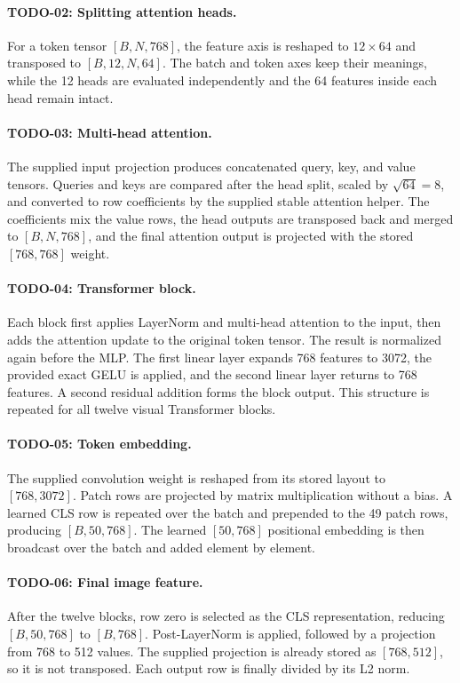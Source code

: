 \documentclass[a4paper,12pt]{article}
\begin{document}
\paragraph{TODO-02: Splitting attention heads.}
For a token tensor \([B,N,768]\), the feature axis is reshaped to
\(12\times64\) and transposed to \([B,12,N,64]\). The batch and token axes keep
their meanings, while the 12 heads are evaluated independently and the 64
features inside each head remain intact.

\paragraph{TODO-03: Multi-head attention.}
The supplied input projection produces concatenated query, key, and value
tensors. Queries and keys are compared after the head split, scaled by
\(\sqrt{64}=8\), and converted to row coefficients by the supplied stable
attention helper. The coefficients mix the value rows, the head outputs are
transposed back and merged to \([B,N,768]\), and the final attention output is
projected with the stored \([768,768]\) weight.

\paragraph{TODO-04: Transformer block.}
Each block first applies LayerNorm and multi-head attention to the input, then
adds the attention update to the original token tensor. The result is normalized
again before the MLP. The first linear layer expands 768 features to 3072, the
provided exact GELU is applied, and the second linear layer returns to 768
features. A second residual addition forms the block output. This structure is
repeated for all twelve visual Transformer blocks.

\paragraph{TODO-05: Token embedding.}
The supplied convolution weight is reshaped from its stored layout to
\([768,3072]\). Patch rows are projected by matrix multiplication without a
bias. A learned CLS row is repeated over the batch and prepended to the 49
patch rows, producing \([B,50,768]\). The learned \([50,768]\) positional
embedding is then broadcast over the batch and added element by element.

\paragraph{TODO-06: Final image feature.}
After the twelve blocks, row zero is selected as the CLS representation,
reducing \([B,50,768]\) to \([B,768]\). Post-LayerNorm is applied, followed by a
projection from 768 to 512 values. The supplied projection is already stored as
\([768,512]\), so it is not transposed. Each output row is finally divided by
its L2 norm.
\end{document}
